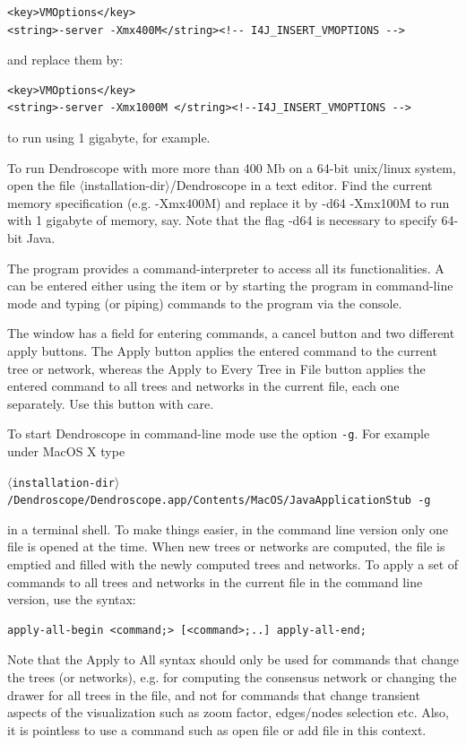 \documentclass[11pt]{article}
\begin{document}
\begin{verbatim}
<key>VMOptions</key>
<string>-server -Xmx400M</string><!-- I4J_INSERT_VMOPTIONS -->
\end{verbatim}

and replace them by:

\begin{verbatim}
<key>VMOptions</key> 
<string>-server -Xmx1000M </string><!--I4J_INSERT_VMOPTIONS --> 
\end{verbatim}


to run using 1 gigabyte, for example. 

To run Dendroscope with more more than 400 Mb on a
64-bit unix/linux system, open the file $\langle$installation-dir$\rangle$/Dendroscope in a text editor. Find the current
memory specification (e.g. -Xmx400M) and replace it by -d64 -Xmx100M to run with 1 gigabyte of
memory, say. Note that the flag -d64 is necessary to specify 64-bit Java.


The program provides a command-interpreter to access all its functionalities. A 
can be entered either using the  item
or by starting the program in command-line mode and typing (or piping) commands to the program via the console.

The  window has a field for entering commands,
a cancel button and two  different apply buttons.
The {\sf Apply} button  applies the entered command to the current tree or network,
whereas the {\sf Apply to Every Tree in File} button 
applies the entered command
to all trees and networks in the current file, each one separately. Use this button with care.

To start Dendroscope in command-line mode use the option \verb"-g". For example under MacOS X type 

$\langle$\verb"installation-dir"$\rangle$\verb"/Dendroscope/Dendroscope.app/Contents/MacOS/JavaApplicationStub -g"

in a terminal shell. To make things easier, in the command line version only one file is opened at the time. When new trees or networks are computed, the file is emptied and filled with the newly computed trees and networks.
To apply a set of commands to all trees and networks in the current file in the command line version, use the syntax:
\begin{verbatim}
apply-all-begin <command;> [<command>;..] apply-all-end;
\end{verbatim}
Note that the {\sf Apply to All} syntax should only be used  
for commands that change the trees (or networks), e.g. for computing the consensus network  or changing the drawer for all trees in the file,  and not for commands that change
transient aspects of the visualization such as zoom factor, edges/nodes selection etc.
Also, it is pointless to use a command such as {\sf open file} or {\sf add file} in this context.
\end{document}
